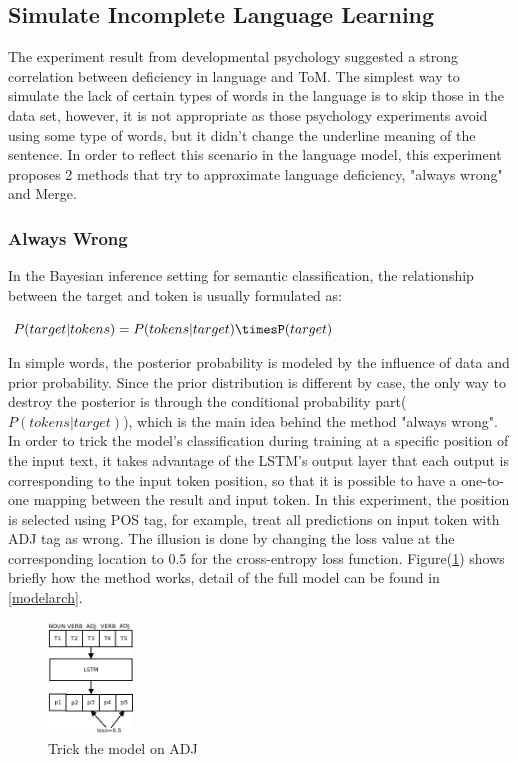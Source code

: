 \documentclass[12pt]{article}
\begin{document}
\subsection{Simulate Incomplete Language Learning} \label{incomplearning}
The experiment result from developmental psychology suggested a strong correlation between deficiency in language and ToM. The simplest way to simulate the lack of certain types of words in the language is to skip those in the data set, however, it is not appropriate as those psychology experiments avoid using some type of words, but it didn't change the underline meaning of the sentence.    
In order to reflect this scenario in the language model, this experiment proposes 2 methods that try to approximate language deficiency, "always wrong" and Merge. 

\subsubsection{Always Wrong}
In the Bayesian inference setting for semantic classification, the relationship between the target and token is usually formulated as:\\
\begin{center}
    $P(target|tokens)=P(tokens|target)\timesP(target)$  
\end{center}
In simple words, the posterior probability is modeled by the influence of data and prior probability. Since the prior distribution is different by case, the only way to destroy the posterior is through the conditional probability part($P(tokens|target)$), which is the main idea behind the method "always wrong". In order to trick the model's classification during training at a specific position of the input text, it takes advantage of the LSTM's output layer that each output is corresponding to the input token position, so that it is possible to have a one-to-one mapping between the result and input token. In this experiment, the position is selected using POS tag, for example, treat all predictions on input token with ADJ tag as wrong. The illusion is done by changing the loss value at the corresponding location to 0.5 for the cross-entropy loss function. Figure(\ref{fig:alwayswrong}) shows briefly how the method works, detail of the full model can be found in \ref{modelarch}.
\begin{figure} [!h]
\begin{center}
\includegraphics[width=0.2\textwidth]{figures/alwayswrong.png}
\caption{Trick the model on ADJ}
\label{fig:alwayswrong}
\end{center}
\end{figure}
\end{document}
